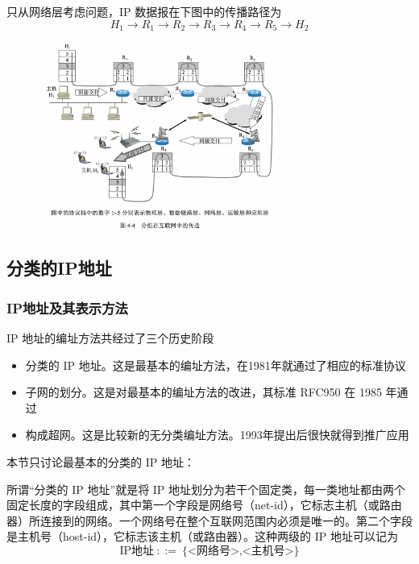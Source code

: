 \documentclass[cs4size,a4paper,10pt]{ctexart}
\begin{document}
	只从网络层考虑问题，IP 数据报在下图中的传播路径为
	$$H_1 \to R_1 \to R_2 \to R_3 \to R_4 \to R_5 \to H_2$$
	\begin{figure}[H]
		\centering
		\includegraphics[width=0.7\textwidth]{img/4.4}
	\end{figure}

	\subsection{分类的IP地址}

	\subsubsection{IP地址及其表示方法}
	IP 地址的编址方法共经过了三个历史阶段
	\begin{itemize}
		\item 分类的 IP 地址。这是最基本的编址方法，在1981年就通过了相应的标准协议
		\item 子网的划分。这是对最基本的编址方法的改进，其标准 RFC950 在 1985 年通过
		\item 构成超网。这是比较新的无分类编址方法。1993年提出后很快就得到推广应用
	\end{itemize}

	本节只讨论最基本的分类的 IP 地址：
	
	所谓“分类的 IP 地址”就是将 IP 地址划分为若干个固定类，每一类地址都由两个固定长度的字段组成，其中第一个字段是网络号（net-id），它标志主机（或路由器）所连接到的网络。一个网络号在整个互联网范围内必须是唯一的。第二个字段是主机号（host-id），它标志该主机（或路由器）。这种两级的 IP 地址可以记为
	$$\mathrm{IP} \mbox{地址}\ ::=\ \{\mbox{<网络号>,<主机号>}\}$$
\end{document}
